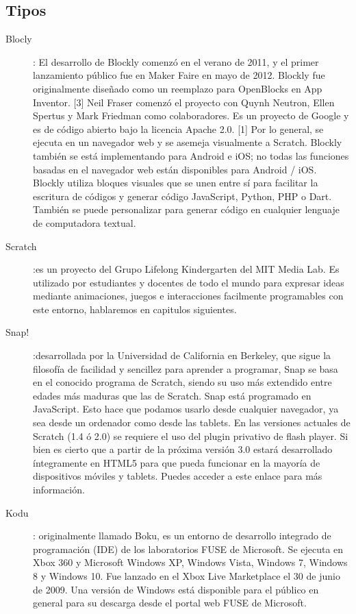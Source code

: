 \subsection{Tipos}
\label{subsec:tipos}
\begin{description}
\item[Blocly]: El desarrollo de Blockly comenzó en el verano de 2011, y el primer lanzamiento público fue en Maker Faire en mayo de 2012. Blockly fue originalmente diseñado como un reemplazo para OpenBlocks en App Inventor. [3] Neil Fraser comenzó el proyecto con Quynh Neutron, Ellen Spertus y Mark Friedman como colaboradores.
Es un proyecto de Google y es de código abierto bajo la licencia Apache 2.0. [1] Por lo general, se ejecuta en un navegador web y se asemeja visualmente a Scratch. Blockly también se está implementando para Android e iOS; no todas las funciones basadas en el navegador web están disponibles para Android / iOS.
Blockly utiliza bloques visuales que se unen entre sí para facilitar la escritura de códigos y generar código JavaScript, Python, PHP o Dart. También se puede personalizar para generar código en cualquier lenguaje de computadora textual.

\item[Scratch]:es un proyecto del Grupo Lifelong Kindergarten del MIT Media Lab.
Es utilizado por estudiantes y docentes de todo el mundo para expresar ideas mediante animaciones, juegos e interacciones facilmente programables con este entorno, hablaremos en capitulos siguientes.

\item[Snap!] :desarrollada por la Universidad de California en Berkeley, que sigue la filosofía de facilidad y sencillez para aprender a programar,  Snap se basa en el conocido programa de Scratch, siendo su uso más extendido entre edades más maduras que las de Scratch.
Snap está programado en JavaScript. Esto hace que podamos usarlo desde cualquier navegador, ya sea desde un ordenador como desde las tablets.
En las versiones actuales de Scratch (1.4 ó 2.0) se requiere el uso del plugin privativo de flash player. Si bien es cierto que a partir de la próxima versión 3.0 estará desarrollado íntegramente en HTML5 para que pueda funcionar en la mayoría de dispositivos móviles y tablets. Puedes acceder a este enlace para más información.

\item[Kodu]: originalmente llamado Boku, es un entorno de desarrollo integrado de programación (IDE) de los laboratorios FUSE de Microsoft. Se ejecuta en Xbox 360 y Microsoft Windows XP, Windows Vista, Windows 7, Windows 8 y Windows 10. Fue lanzado en el Xbox Live Marketplace el 30 de junio de 2009. Una versión de Windows está disponible para el público en general para su descarga desde el portal web FUSE de Microsoft. 

\end{description}